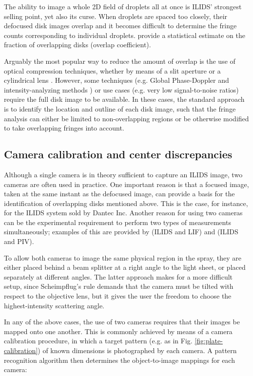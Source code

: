 \documentclass[preprint]{elsarticle}
\begin{document}
The ability to image a whole 2D field of droplets all at once is ILIDS' strongest
selling point, yet also its curse. When droplets are spaced too closely, their
defocused disk images overlap and it becomes difficult to determine the fringe counts
corresponding to individual droplets. \citet{Damaschke02} provide a statistical
estimate on the fraction of overlapping disks (overlap coefficient).

Arguably the most popular way to reduce the amount of overlap is the use of
optical compression techniques, whether by means of a slit aperture \cite{Pan06}
or a cylindrical lens \cite{Kawaguchi02, Maeda02}. However, some techniques
(e.g. Global Phase-Doppler \cite{Damaschke01} and intensity-analyzing
methods \cite{Querel10}) or use cases (e.g. very low signal-to-noise ratios)
require the full disk image to be available. In these cases, the standard
approach is to identify the location and outline of each disk image, such that
the fringe analysis can either be limited to non-overlapping regions or be
otherwise modified to take overlapping fringes into account.

\subsection{Camera calibration and center discrepancies}
Although a single camera is in theory sufficient to capture an ILIDS image, two
cameras are often used in practice. One important reason is that a focused
image, taken at the same instant as the defocused image, can provide a basis for
the identification of overlapping disks mentioned above. This is the case, for
instance, for the ILIDS system sold by Dantec Inc. Another reason for using two
cameras can be the experimental requirement to perform two types of measurements
simultaneously; examples of this are provided by \citet{Hardalupas10a} (ILIDS
and LIF) and \citet{Hardalupas10} (ILIDS and PIV).

To allow both cameras to image the same physical region in the spray, they are
either placed behind a beam splitter at a right angle to the light sheet, or
placed separately at different angles. The latter approach makes for a more
difficult setup, since Scheimpflug's rule demands that the camera must be tilted
with respect to the objective lens, but it gives the user the freedom to choose
the highest-intensity scattering angle.

In any of the above cases, the use of two cameras requires that their images be
mapped onto one another. This is commonly achieved by means of a camera
calibration procedure, in which a target pattern (e.g. as in Fig.
\ref{fig:plate-calibration}) of known dimensions is
photographed by each camera. A pattern recognition algorithm then determines the
object-to-image mappings for each camera:
\end{document}
